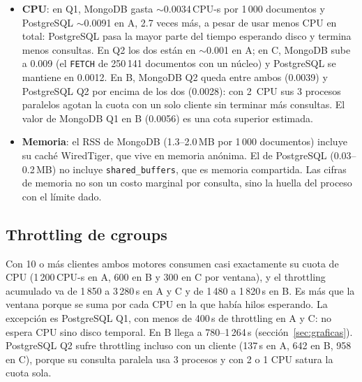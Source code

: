 \documentclass[11pt,letterpaper]{article}
\begin{document}
\begin{itemize}
  \item \textbf{CPU}: en Q1, MongoDB gasta $\sim$0.0034\,CPU-s por 1\,000 documentos y
        PostgreSQL $\sim$0.0091 en A, 2.7 veces más, a pesar de usar menos CPU en total:
        PostgreSQL pasa la mayor parte del tiempo esperando disco y termina menos consultas. En
        Q2 los dos están en $\sim$0.001 en A; en C, MongoDB sube a 0.009 (el \texttt{FETCH} de
        250\,141 documentos con un núcleo) y PostgreSQL se mantiene en 0.0012. En B, MongoDB Q2
        queda entre ambos (0.0039) y PostgreSQL Q2 por encima de los dos (0.0028): con 2~CPU sus
        3 procesos paralelos agotan la cuota con un solo cliente sin terminar más consultas. El
        valor de MongoDB Q1 en B (0.0056) es una cota superior estimada.
  \item \textbf{Memoria}: el RSS de MongoDB (1.3--2.0\,MB por 1\,000 documentos) incluye su caché
        WiredTiger, que vive en memoria anónima. El de PostgreSQL (0.03--0.2\,MB) no incluye
        \texttt{shared\_buffers}, que es memoria compartida. Las cifras de memoria no son
        un costo marginal por consulta, sino la huella del proceso con el límite dado.
\end{itemize}

\subsection*{Throttling de cgroups}
Con 10 o más clientes ambos motores consumen casi exactamente su cuota de CPU (1\,200\,CPU-s en A,
600 en B y 300 en C por ventana), y el throttling acumulado va de 1\,850 a 3\,280\,s en A y C y de
1\,480 a 1\,820\,s en B. Es más que la ventana porque se suma por cada CPU en la que había hilos
esperando. La excepción es PostgreSQL Q1, con menos de 400\,s de throttling en A y C: no
espera CPU sino disco temporal. En B llega a 780--1\,264\,s (sección~\ref{sec:graficas}).
PostgreSQL Q2 sufre throttling incluso con un cliente (137\,s en A, 642 en B, 958 en C), porque
su consulta paralela usa 3 procesos y con 2 o 1 CPU satura la cuota sola.
\end{document}
